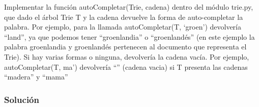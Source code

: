 \documentclass{article}
\begin{document}
Implementar la función autoCompletar(Trie, cadena) dentro del módulo trie.py, que dado el árbol Trie T y la cadena devuelve la forma de auto-completar la palabra. Por ejemplo, para la llamada autoCompletar(T, ‘groen’) devolvería “land”, ya que podemos tener “groenlandia” o “groenlandés” (en este ejemplo la palabra groenlandia y groenlandés pertenecen al documento que representa el Trie). Si hay varias formas o ninguna, devolvería la cadena vacía. Por ejemplo, autoCompletar(T, ma’) devolvería “” (cadena vacia) si T presenta las cadenas “madera” y “mama”
\subsubsection*{Solución}
\end{document}
